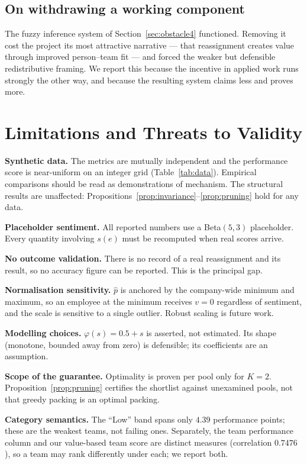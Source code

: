 \documentclass[conference]{IEEEtran}
\newcommand{\vv}{v}
\begin{document}
\subsection{On withdrawing a working component}
The fuzzy inference system of Section~\ref{sec:obstacle4} functioned. Removing it
cost the project its most attractive narrative --- that reassignment creates
value through improved person--team fit --- and forced the weaker but defensible
redistributive framing. We report this because the incentive in applied work runs
strongly the other way, and because the resulting system claims less and proves
more.

\section{Limitations and Threats to Validity}\label{sec:limitations}

\textbf{Synthetic data.} The metrics are mutually independent and the performance
score is near-uniform on an integer grid (Table~\ref{tab:data}). Empirical
comparisons should be read as demonstrations of mechanism. The structural results
are unaffected: Propositions~\ref{prop:invariance}--\ref{prop:pruning} hold for
any data.

\textbf{Placeholder sentiment.} All reported numbers use a Beta$(5,3)$
placeholder. Every quantity involving $s(e)$ must be recomputed when real scores
arrive.

\textbf{No outcome validation.} There is no record of a real reassignment and its
result, so no accuracy figure can be reported. This is the principal gap.

\textbf{Normalisation sensitivity.} $\widehat{p}$ is anchored by the company-wide
minimum and maximum, so an employee at the minimum receives $\vv=0$ regardless of
sentiment, and the scale is sensitive to a single outlier. Robust scaling is
future work.

\textbf{Modelling choices.} $\varphi(s)=0.5+s$ is asserted, not estimated. Its
shape (monotone, bounded away from zero) is defensible; its coefficients are an
assumption.

\textbf{Scope of the guarantee.} Optimality is proven per pool only for $K=2$.
Proposition~\ref{prop:pruning} certifies the shortlist against unexamined pools,
not that greedy packing is an optimal packing.

\textbf{Category semantics.} The ``Low'' band spans only $4.39$ performance
points; these are the weakest teams, not failing ones. Separately, the team
performance column and our value-based team score are distinct measures
(correlation $0.7476$), so a team may rank differently under each; we report both.
\end{document}
